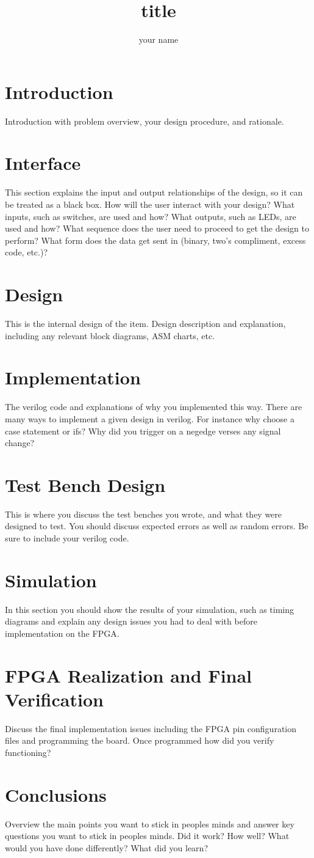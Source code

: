 \documentclass{article}\usepackage{graphicx} %
\author{your name}
\title{title}
\begin{document}
\maketitle

\section{Introduction}
Introduction with problem overview, your design procedure, and rationale.
\section{Interface}
This section explains the input and output relationships of the design, so it can be treated as a black box.  How will the user interact with your design?  What inputs, such as switches, are used and how?  What outputs, such as LEDs, are used and how?  What sequence does the user need to proceed to get the design to perform?  What form does the data get sent in (binary, two's compliment, excess code, etc.)?
\section{Design}
This is the internal design of the item.  Design description and explanation, including any relevant block diagrams, ASM charts, etc.
\section{Implementation}
The verilog code and explanations of why you implemented this way.  There are many ways to implement a given design in verilog.  For instance why choose a case statement or ifs?  Why did you trigger on a negedge verses any signal change?
\section{Test Bench Design}
This is where you discuss the test benches you wrote, and what they were designed to test.  You should discuss expected errors as well as random errors.  Be sure to include your verilog code.
\section{Simulation}
In this section you should show the results of your simulation, such as timing diagrams and explain any design issues you had to deal with before implementation on the FPGA.
\section{FPGA Realization and Final Verification}
Discuss the final implementation issues including the FPGA pin configuration files and programming the board.  Once programmed how did you verify functioning?
\section{Conclusions}
Overview the main points you want to stick in peoples minds and answer key questions you want to stick in peoples minds.  Did it work?  How well? What would you have done differently?  What did you learn?
\end{document}

